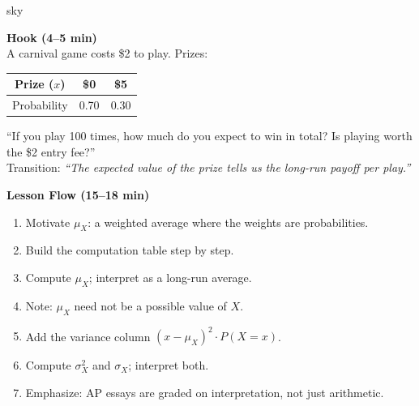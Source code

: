 \documentclass[10pt]{article}
\begin{document}
\begin{skillbox}[Hook]{sky}
\begin{minipage}[t]{0.48\linewidth}
    \textbf{Hook (4--5 min)}\\
    A carnival game costs \$2 to play. Prizes:
    \begin{center}
    \small\renewcommand{\arraystretch}{1.3}
    \begin{tabular}{@{}ccc@{}}
    Prize ($x$) & \$0 & \$5 \\
    \hline
    Probability & 0.70 & 0.30 \\
    \end{tabular}
    \end{center}
    ``If you play 100 times, how much do you expect to win in total?
    Is playing worth the \$2 entry fee?''\\[4pt]
    Transition: \textit{``The expected value of the prize tells us the long-run
    payoff per play.''}
\end{minipage}
\hfill
\begin{minipage}[t]{0.48\linewidth}
    \textbf{Lesson Flow (15--18 min)}
    \begin{enumerate}
        \item Motivate $\mu_X$: a weighted average where the weights are probabilities.
        \item Build the computation table step by step.
        \item Compute $\mu_X$; interpret as a long-run average.
        \item Note: $\mu_X$ need not be a possible value of $X$.
        \item Add the variance column $(x-\mu_X)^2 \cdot P(X=x)$.
        \item Compute $\sigma^2_X$ and $\sigma_X$; interpret both.
        \item Emphasize: AP essays are graded on interpretation, not just arithmetic.
    \end{enumerate}
\end{minipage}
\end{skillbox}
\end{document}

